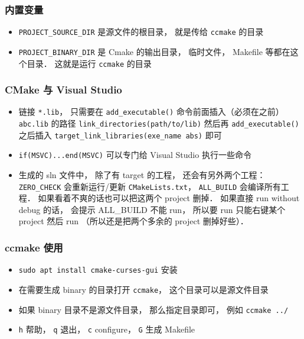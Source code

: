 \subsubsection{内置变量}
\begin{itemize}
\item \verb`PROJECT_SOURCE_DIR` 是源文件的根目录， 就是传给 \verb`ccmake` 的目录
\item \verb`PROJECT_BINARY_DIR` 是 Cmake 的输出目录， 临时文件， Makefile 等都在这个目录． 这就是运行 \verb`ccmake` 的目录
\end{itemize}

\subsubsection{CMake 与 Visual Studio}
\begin{itemize}
\item 链接 \verb`*.lib`， 只需要在 \verb`add_executable()` 命令前面插入（必须在之前） \verb`abc.lib` 的路径 \verb`link_directories(path/to/lib)` 然后再 \verb`add_executable()` 之后插入 \verb`target_link_libraries(exe_name abs)` 即可
\item \verb`if(MSVC)...end(MSVC)` 可以专门给 Visual Studio 执行一些命令
\item 生成的 sln 文件中， 除了有 target 的工程， 还会有另外两个工程： \verb`ZERO_CHECK` 会重新运行/更新 \verb`CMakeLists.txt`， \verb`ALL_BUILD` 会编译所有工程． 如果看着不爽的话也可以把这两个 project 删掉． 如果直接 run without debug 的话， 会提示 ALL_BUILD 不能 run， 所以要 run 只能右键某个 project 然后 run （所以还是把两个多余的 project 删掉好些）．
\end{itemize}

\subsubsection{ccmake 使用}
\begin{itemize}
\item \verb`sudo apt install cmake-curses-gui` 安装
\item 在需要生成 binary 的目录打开 \verb`ccmake`， 这个目录可以是源文件目录
\item 如果 binary 目录不是源文件目录， 那么指定目录即可， 例如 \verb`ccmake ../`
\item \verb`h` 帮助， \verb`q` 退出， \verb`c` configure， \verb`G` 生成 Makefile
\end{itemize}
